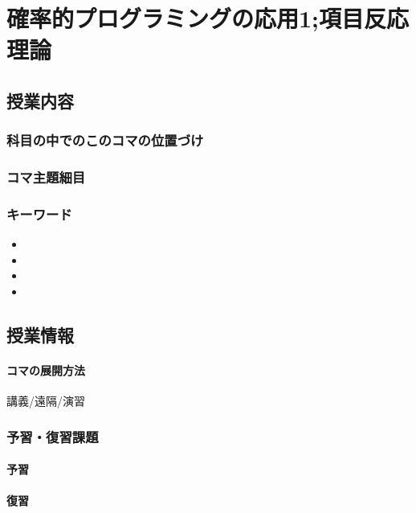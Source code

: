 \section{確率的プログラミングの応用1;項目反応理論}
\subsection{授業内容}
\subsubsection{科目の中でのこのコマの位置づけ}


\subsubsection{コマ主題細目}
\begin{description}

\end{description}
\subsubsection{キーワード}
\begin{itemize}
	\item 
	\item 
	\item 
	\item 
\end{itemize}
\subsection{授業情報}
\paragraph{コマの展開方法}
講義/遠隔/演習
\subsubsection{予習・復習課題}
\paragraph{予習}
\paragraph{復習}